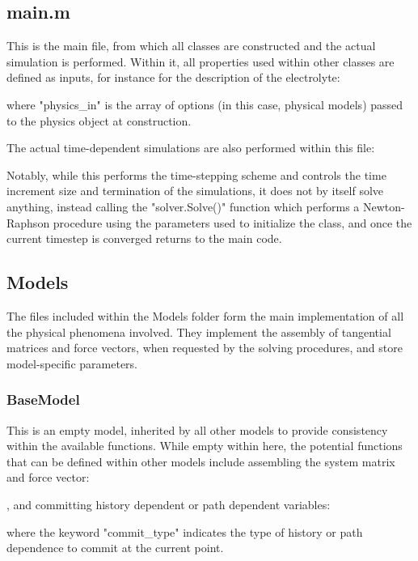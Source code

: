 \documentclass[3p]{elsarticle} %
\begin{document}
\subsection{main.m}
This is the main file, from which all classes are constructed and the actual simulation is performed. Within it, all properties used within other classes are defined as inputs, for instance for the description of the electrolyte:

where "physics{\_}in" is the array of options (in this case, physical models) passed to the physics object at construction. 

The actual time-dependent simulations are also performed within this file:


Notably, while this performs the time-stepping scheme and controls the time increment size and termination of the simulations, it does not by itself solve anything, instead calling the "solver.Solve()" function which performs a Newton-Raphson procedure using the parameters used to initialize the class, and once the current timestep is converged returns to the main code.

\subsection{Models}
The files included within the Models folder form the main implementation of all the physical phenomena involved. They implement the assembly of tangential matrices and force vectors, when requested by the solving procedures, and store model-specific parameters. 

\subsubsection{BaseModel}
This is an empty model, inherited by all other models to provide consistency within the available functions. While empty within here, the potential functions that can be defined within other models include assembling the system matrix and force vector:

, and committing history dependent or path dependent variables:

where the keyword "commit{\_}type" indicates the type of history or path dependence to commit at the current point. 
\end{document}
